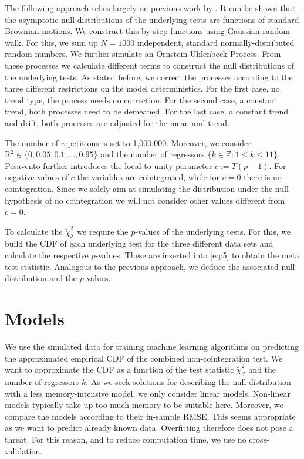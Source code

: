 \documentclass[12pt,a4paper]{article}
\begin{document}
The following approach relies largely on previous work by
\textcite{Pesavento_2004}. It can be shown that the asymptotic null
distributions of the underlying tests are functions of standard Brownian
motions. We construct this by step functions using Gaussian random walk.
For this, we sum up \(N = 1000\) independent, standard
normally-distributed random numbers. We further simulate an
Ornstein-Uhlenbeck-Process. From these processes we calculate different
terms to construct the null distributions of the underlying tests. As
stated before, we correct the processes according to the three different
restrictions on the model deterministics. For the first case, no trend
type, the process needs no correction. For the second case, a constant
trend, both processes need to be demeaned. For the last case, a constant
trend and drift, both processes are adjusted for the mean and trend.

The number of repetitions is set to 1,000,000. Moreover, we consider
\(\text{R}^2 \in \{0, 0.05, 0.1, ..., 0.95\}\) and the number of
regressors \(\{k \in \mathbb{Z}: 1 \leq k \leq 11\}\). Pesavento further
introduces the local-to-unity parameter \(c:= T(\rho-1)\). For negative
values of \(c\) the variables are cointegrated, while for \(c = 0\)
there is no cointegration. Since we solely aim at simulating the
distribution under the null hypothesis of no cointegration we will not
consider other values different from \(c = 0\).

To calculate the \(\tilde{\chi}^2_{\mathcal{I}}\) we require the
\(p\)-values of the underlying tests. For this, we build the \ac{CDF} of
each underlying test for the three different data sets and calculate the
respective \(p\)-values. These are inserted into \eqref{eq:5} to obtain
the meta test statistic. Analogous to the previous approach, we deduce
the associated null distribution and the \(p\)-values.

\hypertarget{models}{%
\section{Models}\label{models}}

We use the simulated data for training machine learning algorithms on
predicting the approximated empirical \ac{CDF} of the combined
non-cointegration test. We want to approximate the \ac{CDF} as a
function of the test statistic \(\tilde{\chi}^2_{\mathcal{I}}\) and the
number of regressors \(k\). As we seek solutions for describing the null
distribution with a less memory-intensive model, we only consider linear
models. Non-linear models typically take up too much memory to be
suitable here. Moreover, we compare the models according to their
in-sample \ac{RMSE}. This seems appropriate as we want to predict
already known data. Overfitting therefore does not pose a threat. For
this reason, and to reduce computation time, we use no cross-validation.
\end{document}
